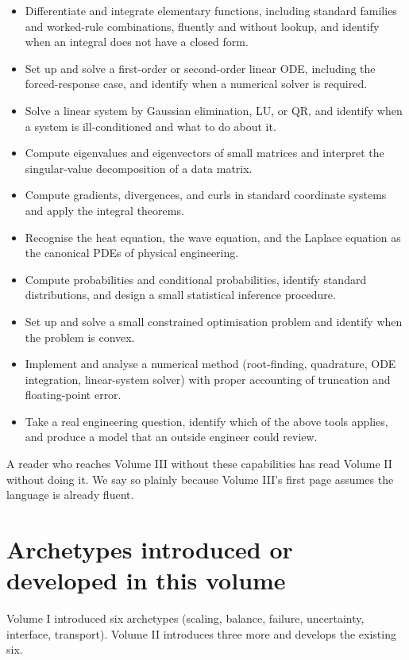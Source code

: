 \begin{itemize}[leftmargin=*]
  \item Differentiate and integrate elementary functions, including
    standard families and worked-rule combinations, fluently and
    without lookup, and identify when an integral does not have a
    closed form.
  \item Set up and solve a first-order or second-order linear ODE,
    including the forced-response case, and identify when a numerical
    solver is required.
  \item Solve a linear system by Gaussian elimination, LU, or QR,
    and identify when a system is ill-conditioned and what to do
    about it.
  \item Compute eigenvalues and eigenvectors of small matrices and
    interpret the singular-value decomposition of a data matrix.
  \item Compute gradients, divergences, and curls in standard
    coordinate systems and apply the integral theorems.
  \item Recognise the heat equation, the wave equation, and the
    Laplace equation as the canonical PDEs of physical engineering.
  \item Compute probabilities and conditional probabilities, identify
    standard distributions, and design a small statistical inference
    procedure.
  \item Set up and solve a small constrained optimisation problem
    and identify when the problem is convex.
  \item Implement and analyse a numerical method (root-finding,
    quadrature, ODE integration, linear-system solver) with proper
    accounting of truncation and floating-point error.
  \item Take a real engineering question, identify which of the
    above tools applies, and produce a model that an outside
    engineer could review.
\end{itemize}

A reader who reaches Volume III without these capabilities has read Volume II without doing it. We say so plainly because Volume III's first page assumes the language is already fluent.

\section*{Archetypes introduced or developed in this volume}

Volume I introduced six archetypes (scaling, balance, failure, uncertainty, interface, transport). Volume II introduces three more and develops the existing six.

